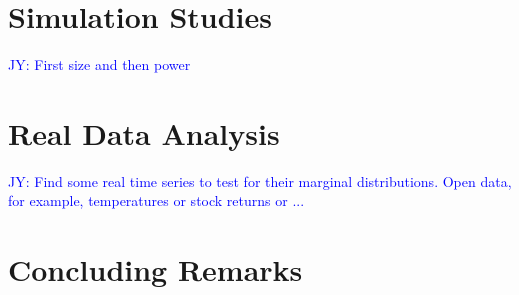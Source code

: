 \documentclass[12pt, letterpaper]{article}
\newcommand{\jy}[1]{\textcolor{blue}{JY: #1}}
\begin{document}
\section{Simulation Studies}
\label{sec:simu}

\jy{First size and then power}


\section{Real Data Analysis}

\jy{Find some real time series to test for their marginal distributions. Open
  data, for example, temperatures or stock returns or ...}



\section{Concluding Remarks}
\label{sec:conclusion}







\end{document}
